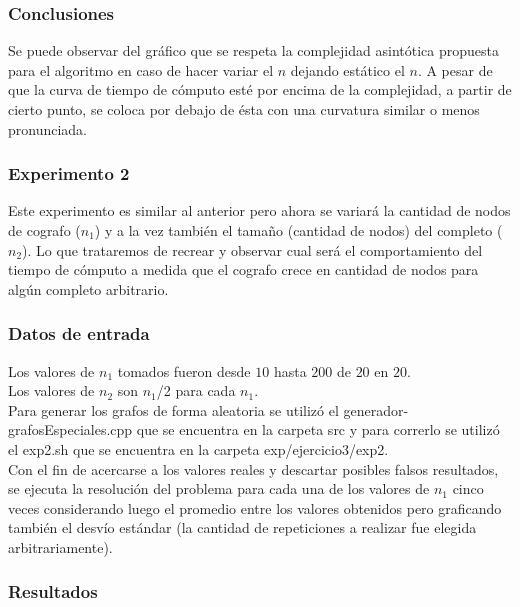      	\subsubsection*{Conclusiones}\;
\noindent Se puede observar del gráfico que se respeta la complejidad asintótica propuesta para el algoritmo en caso de hacer variar el $n$ dejando estático el $n$. A pesar de que la curva de tiempo de cómputo esté por encima de la complejidad, a partir de cierto punto, se coloca por debajo de ésta con una curvatura similar o menos pronunciada.
        

\subsubsection*{Experimento 2}\; 

        \noindent Este experimento es similar al anterior pero ahora se variará la cantidad de nodos de cografo ($n_1$) y a la vez también el tamaño (cantidad de nodos) del completo ($n_2$). Lo que trataremos de recrear y observar cual será el comportamiento del tiempo de cómputo a medida que el cografo crece en cantidad de nodos para algún completo arbitrario.

     	\subsubsection*{Datos de entrada}\;
\noindent Los valores de $n_1$ tomados fueron desde $10$ hasta $200$ de $20$ en $20$.\\
       Los valores de $n_2$ son $n_1$/2 para cada $n_1$. \\
        Para generar los grafos de forma aleatoria se utilizó el generador-grafosEspeciales.cpp que se encuentra en la carpeta src y para correrlo se utilizó el exp2.sh que se encuentra en la carpeta exp/ejercicio3/exp2. \\
        Con el fin de acercarse a los valores reales y descartar posibles falsos resultados, se ejecuta la resolución del problema para cada una de los valores de $n_1$ cinco veces considerando luego el promedio entre los valores obtenidos pero graficando también el desvío estándar (la cantidad de repeticiones a realizar fue elegida arbitrariamente).\; 

\subsubsection*{Resultados}\;

